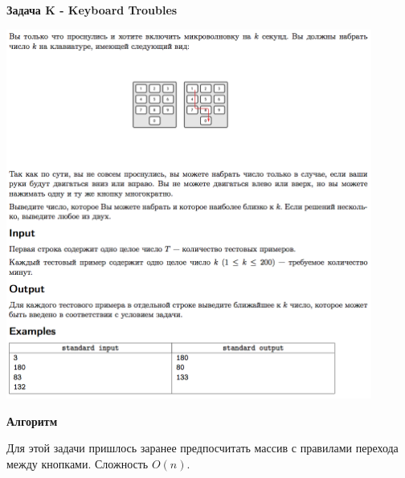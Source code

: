 \documentclass[a4paper,12pt]{article}
\begin{document}
\newpage
\textbf{{\large Задача K - Keyboard Troubles}}

\begin{center}
\includegraphics[width=0.9\textwidth]{OC_Europe/OC_Europe_K.png}\\ [1cm]
\end{center}

\newpage
\textbf{{\large Алгоритм}}

Для этой задачи пришлось заранее предпосчитать массив с правилами перехода между кнопками. Сложность $O(n)$. \\
\end{document}
